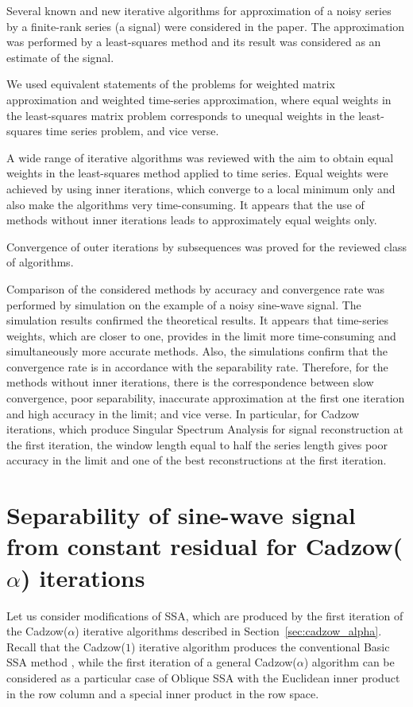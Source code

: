 \documentclass[sii]{ipart}
\begin{document}
Several known and new iterative algorithms for approximation of a noisy series by a finite-rank series (a signal) were considered in the paper. The approximation was performed by a least-squares method and its result was considered as an estimate of the signal.

 We used equivalent statements of the problems for weighted matrix approximation and  weighted time-series approximation, where equal weights in the least-squares matrix problem corresponds
 to unequal weights in the least-squares time series problem, and vice verse.

A wide range of iterative algorithms was reviewed with the aim to obtain equal weights in the least-squares method applied to time series.
Equal weights were achieved by using inner iterations, which converge to a local minimum only and also make the algorithms very time-consuming. It appears that the use of methods without inner iterations leads to approximately equal weights only.

Convergence of outer iterations by subsequences was proved for the reviewed class of algorithms.

Comparison of the considered methods by accuracy and convergence rate was performed by simulation on the example of a noisy sine-wave signal. The simulation results confirmed the theoretical results. It appears that time-series weights, which are closer to one, provides in the limit more time-consuming and simultaneously more accurate methods.
Also, the simulations confirm that the convergence rate is in accordance with the separability rate. Therefore, for the methods without inner iterations,
there is the correspondence between slow convergence, poor separability,
inaccurate approximation at the first one iteration and high accuracy in the limit; and vice verse.
In particular, for Cadzow iterations, which produce Singular Spectrum Analysis for signal reconstruction at the first iteration, the window length equal to half the series length gives poor accuracy in the limit and
one of the best reconstructions at the first iteration.


\appendix

\section{Separability of sine-wave signal from constant residual for Cadzow($\alpha$) iterations}
\label{sec:app}

Let us consider modifications of SSA, which are produced by the first iteration of the Cadzow($\alpha$) iterative algorithms described in Section~\ref{sec:cadzow_alpha}. Recall that the Cadzow($1$) iterative algorithm produces the conventional Basic SSA method \cite{Golyandina.etal2001,Golyandina.Zhigljavsky2012}, while the first iteration of a general Cadzow($\alpha$) algorithm can be considered as a
particular case of Oblique SSA \cite{Golyandina2013} with the Euclidean inner product in the row column and a special inner product in the row space.
\end{document}

